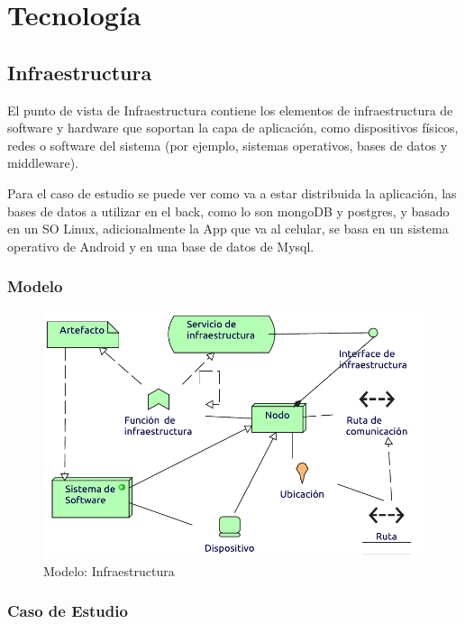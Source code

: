 \chapter{Tecnología}

\section{Infraestructura}
El punto de vista de Infraestructura contiene los elementos de infraestructura de software y hardware que soportan la capa de aplicación, como dispositivos físicos, redes o software del sistema (por ejemplo, sistemas operativos, bases de datos y middleware). \cite{ArchiMat55:online} \vspace{\baselineskip}

Para el caso de estudio se puede ver como va a estar distribuida la aplicación, las bases de datos a utilizar en el back, como lo son mongoDB y postgres, y basado en un SO Linux, adicionalmente la App que va al celular, se basa en un sistema operativo de Android y en una base de datos de Mysql.

\subsection{Modelo}
\begin{figure}[h!]
	\centering
	\includegraphics[width=0.8\linewidth]{Arquitectura/Tecnologia/imgs/insfraestructuraMetamodelo.pdf}
	\caption{Modelo: Infraestructura}
\end{figure}
\newpage
\subsection{Caso de Estudio}

